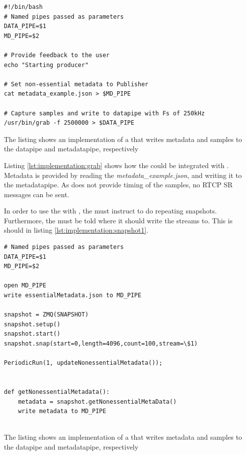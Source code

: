 \begin{listing}[H] 
\begin{verbatim}
#!/bin/bash
# Named pipes passed as parameters
DATA_PIPE=$1
MD_PIPE=$2

# Provide feedback to the user
echo "Starting producer"

# Set non-essential metadata to Publisher
cat metadata_example.json > $MD_PIPE

# Capture samples and write to datapipe with Fs of 250kHz
/usr/bin/grab -f 2500000 > $DATA_PIPE
\end{verbatim}
\caption{The listing shows an implementation of a \pro{} that writes metadata and samples to the datapipe and metadatapipe, respectively}
\label{lst:implementation:grab}
\end{listing}

Listing \ref{lst:implementation:grab} shows how the \pro{} could be integrated with .
Metadata is provided by reading the \textit{metadata\_example.json}, and writing it to the metadatapipe.
As  does not provide timing of the samples, no RTCP SR messages can be sent.


In order to use the \pub{} with , the \pro{} must instruct  to do repeating snapshots. Furthermore, the  must be told where it should write the streams to. This is should in listing \ref{lst:implementation:snapshot1}.

\begin{listing}[H] 
\begin{verbatim}
# Named pipes passed as parameters
DATA_PIPE=$1
MD_PIPE=$2

open MD_PIPE
write essentialMetadata.json to MD_PIPE

snapshot = ZMQ(SNAPSHOT)
snapshot.setup()
snapshot.start()
snapshot.snap(start=0,length=4096,count=100,stream=\$1)

PeriodicRun(1, updateNonessentialMetadata());


def getNonessentialMetadata():
	metadata = snapshot.getNonessentialMetaData()
	write metadata to MD_PIPE
	
\end{verbatim}
\caption{The listing shows an implementation of a \pro{} that writes metadata and samples to the datapipe and metadatapipe, respectively}
\label{lst:implementation:snapshot1}
\end{listing}

